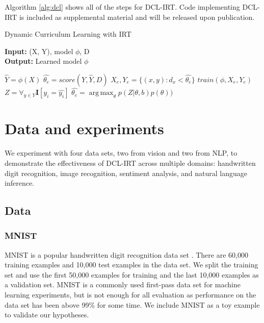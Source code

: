 \documentclass[letterpaper]{article} %
\begin{document}
Algorithm \ref{alg:dcl} shows all of the steps for DCL-IRT. Code implementing DCL-IRT is included as supplemental material and will be released upon publication. 

\begin{algorithm}
	\caption{Dynamic Curriculum Learning with IRT}
	\hspace*{\algorithmicindent}\textbf{Input:} (X, Y), model $\phi$, D \\
	\hspace*{\algorithmicindent}\textbf{Output:} Learned model $\phi$ 
	\begin{algorithmic}[1]
			\State $\hat{Y} = \phi(X)$
			\State $\hat{\theta_e} = score(Y, \hat{Y}, D)$
			\State $X_e, Y_e = \{(x,y): d_x < \hat{\theta_e}\}$
			\State $train(\phi, X_e, Y_e)$
		\EndWhile 
			\State $Z = \forall_{y \in Y} \mathbf{I}[y_i = \hat{y_i}]$
			\State $\hat{\theta_e} = \operatorname*{arg\,max}_\theta p(Z \vert \theta, b)p(\theta))$
		\EndProcedure 
	\end{algorithmic} 
	\label{alg:dcl}
\end{algorithm} 

\section{Data and experiments} 

We experiment with four data sets, two from vision and two from NLP, to demonstrate the effectiveness of DCL-IRT across multiple domains: handwritten digit recognition, image recognition, sentiment analysis, and natural language inference.

\subsection{Data}
\subsubsection{MNIST}

MNIST is a popular handwritten digit recognition data set \cite{lecun_mnist_nodate}.
There are 60,000 training examples and 10,000 test examples in the data set.
We split the training set and use the first 50,000 examples for training and the last 10,000 examples as a validation set.
MNIST is a commonly used first-pass data set for machine learning experiments, but is not enough for all evaluation as performance on the data set has been above 99\% for some time.
We include MNIST as a toy example to validate our hypotheses.
\end{document}
